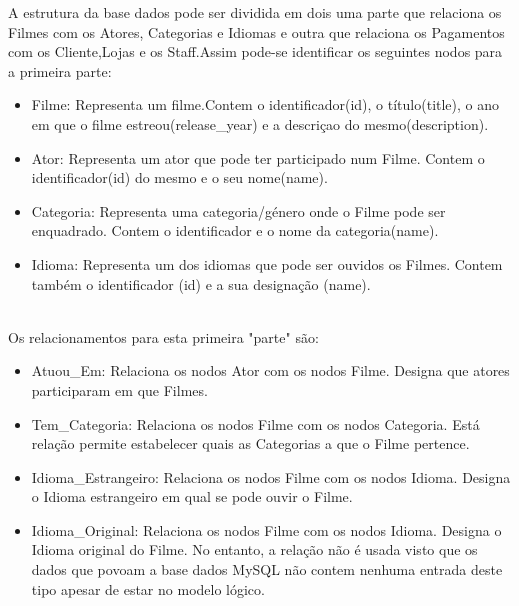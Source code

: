 A estrutura da base dados pode ser dividida em dois uma parte que relaciona os Filmes com os Atores, Categorias e Idiomas e outra que relaciona os Pagamentos com os Cliente,Lojas e os Staff.Assim pode-se identificar os seguintes nodos para a primeira parte:
\begin{itemize}

\item Filme: Representa um filme.Contem o identificador(id), o título(title), o ano em que o filme estreou(release\_year) e a descriçao do mesmo(description).
\hfill\\
\item Ator: Representa um ator que pode ter participado num Filme. Contem o identificador(id) do mesmo e o seu nome(name).
\hfill\\
\item Categoria: Representa uma categoria/género onde o Filme pode ser enquadrado. Contem o identificador e o nome da categoria(name).
\hfill\\
\item Idioma: Representa um dos idiomas que pode ser ouvidos os Filmes. Contem também o identificador (id) e a sua designação (name). 

\end{itemize}
\hfill\\
Os relacionamentos para esta primeira "parte" são:\newline
\hfill\\
\begin{itemize}

\item Atuou\_Em: Relaciona os nodos Ator com os nodos Filme. Designa que atores participaram em que Filmes.
\hfill\\
\item Tem\_Categoria: Relaciona os nodos Filme com os nodos Categoria. Está relação permite estabelecer quais as Categorias a que o Filme pertence.
\hfill\\
\item Idioma\_Estrangeiro: Relaciona os nodos Filme com os nodos Idioma. Designa o Idioma estrangeiro em qual se pode ouvir o Filme.
\hfill\\
\item Idioma\_Original: Relaciona os nodos Filme com os nodos Idioma. Designa o Idioma original do Filme. No entanto, a relação não é usada visto que os dados que povoam a base dados MySQL não contem nenhuma entrada deste tipo apesar de estar no modelo lógico.
\end{itemize}

